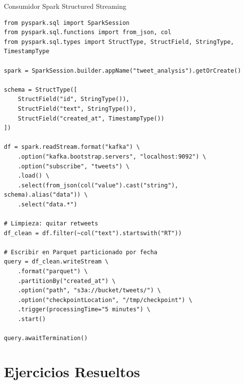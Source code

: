 \documentclass[aspectratio=169, 10pt, xcolor=table]{beamer}
\begin{document}
\begin{frame}[fragile]{Consumidor Spark Structured Streaming}
    \begin{lstlisting}[style=python]
from pyspark.sql import SparkSession
from pyspark.sql.functions import from_json, col
from pyspark.sql.types import StructType, StructField, StringType, TimestampType

spark = SparkSession.builder.appName("tweet_analysis").getOrCreate()

schema = StructType([
    StructField("id", StringType()),
    StructField("text", StringType()),
    StructField("created_at", TimestampType())
])

df = spark.readStream.format("kafka") \
    .option("kafka.bootstrap.servers", "localhost:9092") \
    .option("subscribe", "tweets") \
    .load() \
    .select(from_json(col("value").cast("string"), schema).alias("data")) \
    .select("data.*")

# Limpieza: quitar retweets
df_clean = df.filter(~col("text").startswith("RT"))

# Escribir en Parquet particionado por fecha
query = df_clean.writeStream \
    .format("parquet") \
    .partitionBy("created_at") \
    .option("path", "s3a://bucket/tweets/") \
    .option("checkpointLocation", "/tmp/checkpoint") \
    .trigger(processingTime="5 minutes") \
    .start()

query.awaitTermination()
    \end{lstlisting}
\end{frame}

\section{Ejercicios Resueltos}
\end{document}
